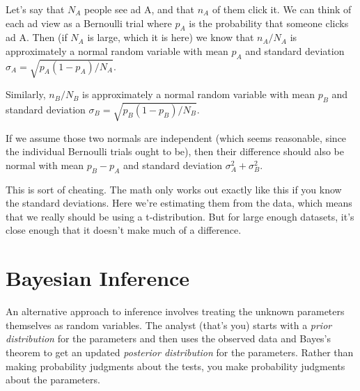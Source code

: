 Let's say that $N_A$ people see ad A, and that $n_A$ of them click it. We can think of each ad
view as a Bernoulli trial where $p_A$ is the probability that someone clicks ad A. Then (if
$N_A$ is large, which it is here) we know that $n_A/N_A$ is approximately a normal random
variable with mean $p_A$ and standard deviation $\sigma_A =
    \sqrt{p_A(1 - p_A)/N_A}$.

Similarly, $n_B/N_B$ is approximately a normal random variable with mean $p_B$ and standard deviation $\sigma_B =
    \sqrt{p_B(1 - p_B)/N_B}$.

If we assume those two normals are independent (which seems reasonable, since the
individual Bernoulli trials ought to be), then their difference should also be normal
with mean $p_B - p_A$ and standard deviation $\sigma_A^2 + \sigma_B^2$.
\begin{tcolorbox}
    This is sort of cheating. The math only works out exactly like this if
    you know the standard deviations. Here we're estimating them
    from the data, which means that we really should be using a t-distribution. But for large enough datasets, it's close enough that it
    doesn't make much of a difference.
\end{tcolorbox}

\section{Bayesian Inference}
An alternative approach to inference involves treating the unknown parameters
themselves as random variables. The analyst (that’s you) starts with a \emph{prior distribution} for the parameters and then uses the observed data and Bayes’s theorem to get an
updated \emph{posterior distribution} for the parameters. Rather than making probability
judgments about the tests, you make probability judgments about the parameters.